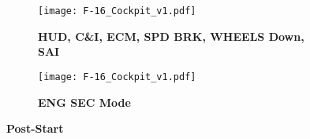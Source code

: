 \documentclass[fontInter]{TechCheck}
\begin{document}
	\begin{figure}[h]
		\centering
		\begin{subfigure}[t]{0.45\linewidth}
			\centering
			\texttt{[image: F-16\_Cockpit\_v1.pdf]}
			\caption*{\textbf{HUD, C\&I, ECM, SPD BRK, WHEELS Down, SAI}}
		\end{subfigure}
		\begin{subfigure}[t]{0.45\linewidth}
			\centering
			\texttt{[image: F-16\_Cockpit\_v1.pdf]}
			\caption*{\textbf{ENG SEC Mode}}
		\end{subfigure}
		\caption{\textbf{Post-Start}}
		\label{fig:proc:poststart2}
	\end{figure}

	\clearpage
\end{document}
